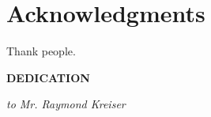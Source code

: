 \documentclass[12pt]{book}
\theoremstyle{theorem}
\theoremstyle{remark}
\theoremstyle{definition}
\theoremstyle{plain}
\theoremstyle{plain}
\theoremstyle{plain}
\theoremstyle{definition}
\theoremstyle{theorem}
\begin{document}
\begin{spacing}{1.5}
  \tableofcontents
\end{spacing}

\chapter*{Acknowledgments}
Thank people.





\clearpage


\begin{center}
    \textbf{DEDICATION}


\emph{to Mr. Raymond Kreiser}


\end{center}




\clearpage

\pagestyle{headings}
\setcounter{page}{1}
\renewcommand{\chaptermark}[1]{\markboth{\sc{\chaptername\ \thechapter.\ #1}}{}}
\renewcommand{\sectionmark}[1]{\markright{\sc{\thesection.\ #1}}{}}





\clearpage
{}
\singlespacing


\end{document}
